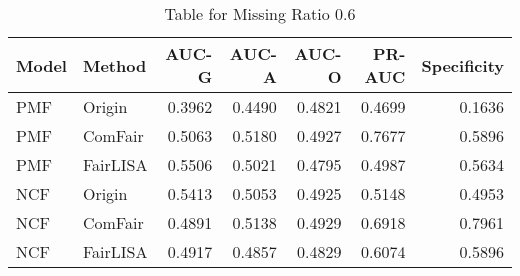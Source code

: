 \begin{table}
\centering
\caption{Table for Missing Ratio 0.6}
\label{tab:missing_0.6}
\begin{tabular}{llrrrrr}
\toprule
Model &   Method &  AUC-G &  AUC-A &  AUC-O &  PR-AUC &  Specificity \\
\midrule
  PMF &   Origin & 0.3962 & 0.4490 & 0.4821 &  0.4699 &       0.1636 \\
  PMF &  ComFair & 0.5063 & 0.5180 & 0.4927 &  0.7677 &       0.5896 \\
  PMF & FairLISA & 0.5506 & 0.5021 & 0.4795 &  0.4987 &       0.5634 \\
  NCF &   Origin & 0.5413 & 0.5053 & 0.4925 &  0.5148 &       0.4953 \\
  NCF &  ComFair & 0.4891 & 0.5138 & 0.4929 &  0.6918 &       0.7961 \\
  NCF & FairLISA & 0.4917 & 0.4857 & 0.4829 &  0.6074 &       0.5896 \\
\bottomrule
\end{tabular}
\end{table}
